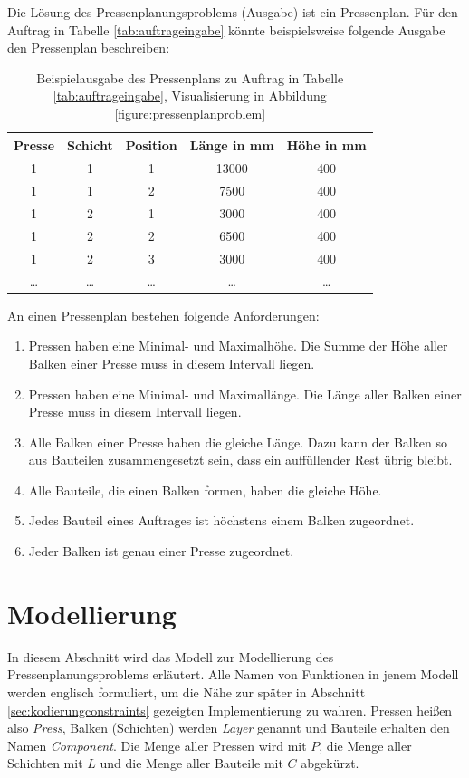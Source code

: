 Die Lösung des Pressenplanungsproblems (Ausgabe) ist ein Pressenplan.
Für den Auftrag in Tabelle \ref{tab:auftrageingabe} könnte beispielsweise folgende Ausgabe den Pressenplan beschreiben:

\begin{table}[H]
    \centering
    \begin{tabular}{|c|c|c|c|c|}
        \hline
        \textbf{Presse} & \textbf{Schicht} & \textbf{Position} & \textbf{Länge in mm} & \textbf{Höhe in mm} \\
        \hline
        1 & 1 & 1 & 13000 & 400 \\
        1 & 1 & 2 & 7500 & 400 \\
        1 & 2 & 1 & 3000 & 400 \\
        1 & 2 & 2 & 6500 & 400 \\
        1 & 2 & 3 & 3000 & 400 \\
        \ldots & \ldots & \ldots & \ldots & \ldots \\
        \hline
    \end{tabular}
    \caption{Beispielausgabe des Pressenplans zu Auftrag in Tabelle \ref{tab:auftrageingabe}, Visualisierung in Abbildung \ref{figure:pressenplanproblem}}
    \label{tab:auftragausgabe}
\end{table}

An einen Pressenplan bestehen folgende Anforderungen:
\begin{enumerate}
    \item Pressen haben eine Minimal- und Maximalhöhe. Die Summe der Höhe aller Balken einer Presse muss in diesem Intervall liegen.
    \item Pressen haben eine Minimal- und Maximallänge. Die Länge aller Balken einer Presse muss in diesem Intervall liegen.
    \item Alle Balken einer Presse haben die gleiche Länge. Dazu kann der Balken so aus Bauteilen zusammengesetzt sein, dass ein auffüllender Rest übrig bleibt.
    \item Alle Bauteile, die einen Balken formen, haben die gleiche Höhe.
    \item Jedes Bauteil eines Auftrages ist höchstens einem Balken zugeordnet.
    \item Jeder Balken ist genau einer Presse zugeordnet.
\end{enumerate}

\section{Modellierung}
\label{sec:modellierung}
In diesem Abschnitt wird das Modell zur Modellierung des Pressenplanungsproblems erläutert.
Alle Namen von Funktionen in jenem Modell werden englisch formuliert, um die Nähe zur später in Abschnitt \ref{sec:kodierungconstraints} gezeigten Implementierung zu wahren.
Pressen heißen also \textit{Press}, Balken (Schichten) werden \textit{Layer} genannt und Bauteile erhalten den Namen \textit{Component}.
Die Menge aller Pressen wird mit $P$, die Menge aller Schichten mit $L$ und die Menge aller Bauteile mit $C$ abgekürzt.

